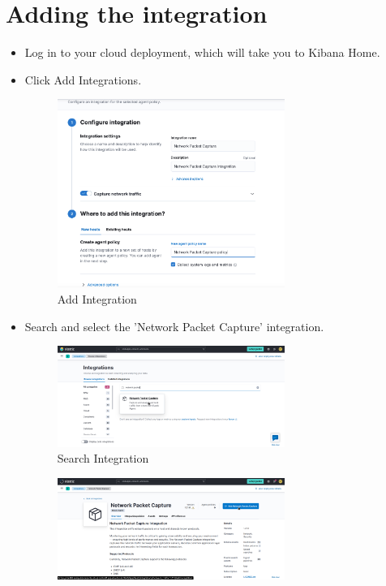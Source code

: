 \documentclass{report}
\begin{document}
\section{Adding the integration}
\begin{itemize}
	\item Log in to your cloud deployment, which will take you to Kibana Home.
	\item Click Add Integrations.
	\begin{figure}
		\centering
		\includegraphics[width=0.7\textwidth]{Images/add-integration.png}
		\caption{Add Integration}
		\label{fig:Add Integration}
	\end{figure}
	\item Search and select the 'Network Packet Capture' integration.
	\begin{figure}
		\centering	
		\includegraphics[width=0.7\textwidth]{Images/search-network-packet.png}
		\caption{Search Integration}
		\label{fig:Search Integration}
	\end{figure}
	\begin{figure}
		\centering
		\includegraphics[width=0.7\textwidth]{Images/add-network-packet.png}

\end{figure}
\end{itemize}
\end{document}
